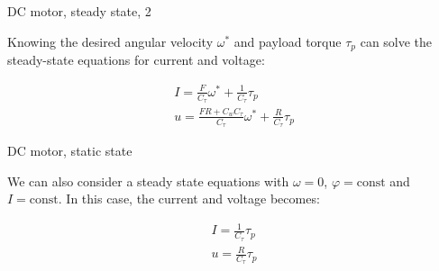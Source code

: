 \documentclass{beamer}
\begin{document}
\begin{frame}{DC motor, steady state, 2}
	\begin{flushleft}
		
		Knowing the desired angular velocity $ \omega^*$ and payload torque $\tau_p$ can solve the steady-state equations for current and voltage:
		

\begin{align}
	I = \frac{F}{C_\tau} \omega^* + \frac{1}{C_\tau} \tau_p 
	\\
	u = \frac{FR + C_w C_\tau}{C_\tau} \omega^* + \frac{R}{C_\tau} \tau_p
\end{align}
		
		
	\end{flushleft}
\end{frame}



\begin{frame}{DC motor, static state}
	\begin{flushleft}
		
		We can also consider a steady state equations with $\omega = 0$,  $\varphi = \text{const}$ and $I = \text{const}$. In this case, the current and voltage becomes:
		
		\begin{align}
			I = \frac{1}{C_\tau} \tau_p 
			\\
			u = \frac{R}{C_\tau} \tau_p
		\end{align}
		
		
	\end{flushleft}
\end{frame}
\end{document}
